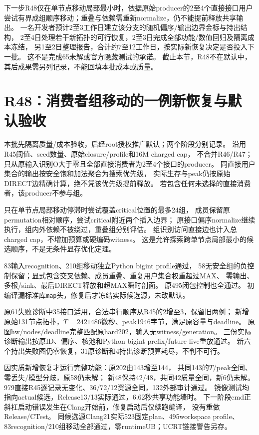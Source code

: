 \documentclass[UTF8,fontset=fandol,11pt]{ctexart}
\begin{document}
下一步R48仅在单节点移动局部最小时，依据原始producer的2至4个直接接口用户
尝试有界成组顺序移动；重叠与依赖需重新normalize，仍不能提前释放共享输出。
一名开发者预计2至3工作日建立该分支的随机偏序/输出边界金标与持出结构，
2至4日处理若干新拓扑的可行恢复，2至3日完成全部功能/数值回归及隔离成本冻结，
另1至2日整理报告，合计约7至12工作日，按实际新恢复决定是否投入下一批。
这不是完成65未解或官方隐藏测试的承诺。
截止本节，R48不在默认中，其后成果需另列记录，不能回填本批成本或质量。

\section{R48：消费者组移动的一例新恢复与默认验收}
本批先隔离质量/成本验收，后经root授权推广默认；两个阶段分别记录。
沿用R45阈值、seed数量、原始closure/profile和16M charged cap，
不合并R46/R47；只从原输入识别O大于零且全部直接消费者为2至4个接口的producer。
同直接用户集合的输出按安全饱和加法聚合为搜索优先级，
实际生存与peak仍按原始DIRECT边精确计算，绝不凭该优先级提前释放。
若包含任何未选择的直接消费者，该producer不参与组。

只在单节点局部移动停滞时尝试覆盖critical位置的最多24组，
成员保留原permutation相对顺序，尝试critical附近两个插入边界；
原接口偏序normalize继续执行，组内外依赖不被绕过，重叠组分别评估。
组识别访问直接边也计入总charged cap，不增加预算或硬编码witness。
这是允许探索跨单节点局部最小的候选顺序，不是无条件显存优化定理。

83输入recognition、210组移动独立Python bigint profile通过，
58无安全组的负控制保留；显式包含交叉依赖、成员重叠、重复用户集合权重超过MAX、
零输出、多根/sink、最后DIRECT释放和超MAX瞬时剖面。
原495闭包控制也全通过。
初编译漏标准库\texttt{map}头，修复后才冻结实际候选源，未改默认。

原61失败诊断中35接口适用，合法串行顺序从R45的2增至3，保留旧两例；
新增原始131节点拓扑，$T=2421486$微秒、peak1946字节，满足原容量与deadline。
原图hw/nodes/deadline完整匹配原hard202，输入无witness/generation。
三份实际诊断输出按原ID、偏序、核池和Python bigint prefix/future live重放通过。
新六个持出失败图仍零恢复，31原诊断和4持出诊断预算耗尽，不判不可行。

因实质新增恢复才运行完整功能：原202由143增至144，
共同143的$T$/peak全同、零丢失/模型分歧，原58仍未解；
新48保持42/48，共同42质量全同，新6仍未解。
979直接R45逐记录无变化、36/72/12资源全同，132外部审计通过。
镜像测试均指向actual候选，Release13/13实际通过，6.62秒共享功能墙时。
下一阶段cmd正斜杠启动错误发生在Clang开始前，修复启动后仅续跑编译，
没有重做Release/CTest。
同候选源Clang21实际523固定plan、495workspace profile、
83recognition/210组移动全部通过，零runtimeUB；UCRT链接警告另存。
\end{document}
